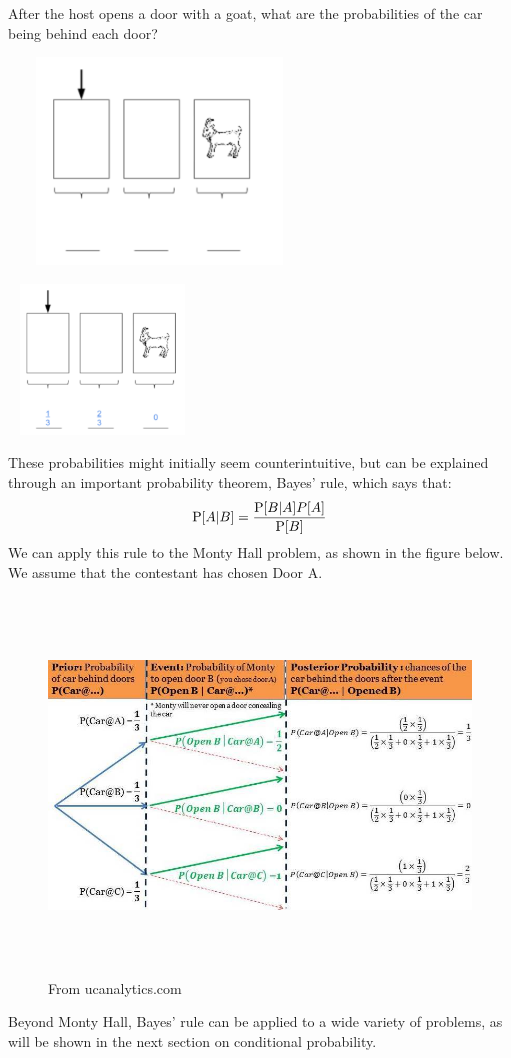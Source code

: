After the host opens a door with a goat, what are the probabilities of 
the car being behind each door?
\begin{center}
\includegraphics[width=8cm, height=5.5cm]{intro_doors_2.jpg}
\end{center}
\begin{solution}
\begin{center}
\includegraphics[width=5cm, height=4cm]{intro_doors_2_sol.jpg}
\end{center}
 \end{solution}
 
 These probabilities might initially seem counterintuitive, but can be explained through an important probability theorem, Bayes' rule, which says that:
 \[ \P[A|B] = \frac{\P[B|A]P[A]}{\P[B]} \]
 We can apply this rule to the Monty Hall problem, as shown in the figure below. We assume that the contestant has chosen Door A. \newline
 \begin{figure}[!ht]
\caption{From ucanalytics.com}
\includegraphics[width=17cm, height=10cm]{BayesRuleMontyHall.jpg}
\end{figure}
\newline 
Beyond Monty Hall, Bayes' rule can be applied to a wide variety of problems, as will be shown in the next section on conditional probability. 
